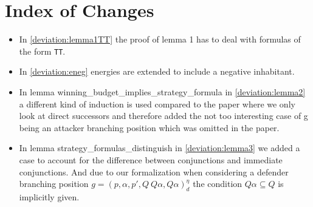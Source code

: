 \section{Index of Changes}
\begin{itemize}
    \item In \ref{deviation:lemma1TT} the proof of lemma 1 has to deal with formulas of the form \texttt{TT}. 
    \item In \ref{deviation:eneg} energies are extended to include a negative inhabitant. 
    \item  In lemma winning\_budget\_implies\_strategy\_formula in \ref{deviation:lemma2} a different kind of induction is used compared to the paper 
    where we only look at direct successors and therefore added the not too interesting case of g being an 
    attacker branching position which was omitted in the paper.
    \item In lemma strategy\_formulas\_distinguish in  \ref{deviation:lemma3} we added a case to account for the difference between 
    conjunctions and immediate conjunctions. And due to our formalization when considering a
    defender branching position $g=(p,\alpha ,p', Q \ Q\alpha, Q\alpha)_d^\eta$ the condition 
    $Q \alpha \subseteq Q$ is implicitly given.
\end{itemize}
